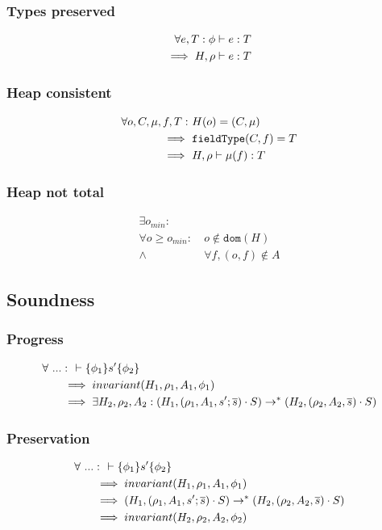 \documentclass[11pt,a4paper]{article}
\begin{document}
\subsubsection{Types preserved}
\begin{align*}
    \forall e, T : \phi \vdash e : T& \\
    \implies H, \rho \vdash e : T&
\end{align*}

\subsubsection{Heap consistent}
\begin{align*}
\forall o, C, \mu, f, T :&~ 
H(o) = (C, \mu) \\
\implies&~ 
\texttt{fieldType}(C,f) = T \\
\implies&~
H, \rho \vdash \mu(f) : T
\end{align*}

\subsubsection{Heap not total}
\begin{align*}
\exists o_{min} :&\\
\forall o \ge o_{min} :&~ o \not \in \texttt{dom}(H) \\
\wedge&~ \forall f, (o, f) \not \in A
\end{align*}

\subsection{Soundness}
\subsubsection{Progress}
\begin{align*}
\forall~ ... &:~~ \vdash\{\phi_1\}s'\{\phi_2\} 
\\ &\implies invariant(H_1, \rho_1, A_1, \phi_1)
\\ &\implies \exists H_2, \rho_2, A_2 : (H_1, (\rho_1, A_1, s' ; \overline{s}) \cdot S)
							\rightarrow^* (H_2, (\rho_2, A_2, \overline{s}) \cdot S)
\end{align*}

\subsubsection{Preservation}
\begin{align*}
\forall~ ... &:~~ \vdash\{\phi_1\}s'\{\phi_2\} 
\\ &\implies invariant(H_1, \rho_1, A_1, \phi_1)
\\ &\implies (H_1, (\rho_1, A_1, s' ; \overline{s}) \cdot S)
  \rightarrow^* (H_2, (\rho_2, A_2, \overline{s}) \cdot S)
\\ &\implies invariant(H_2, \rho_2, A_2, \phi_2)
\end{align*}
\end{document}
